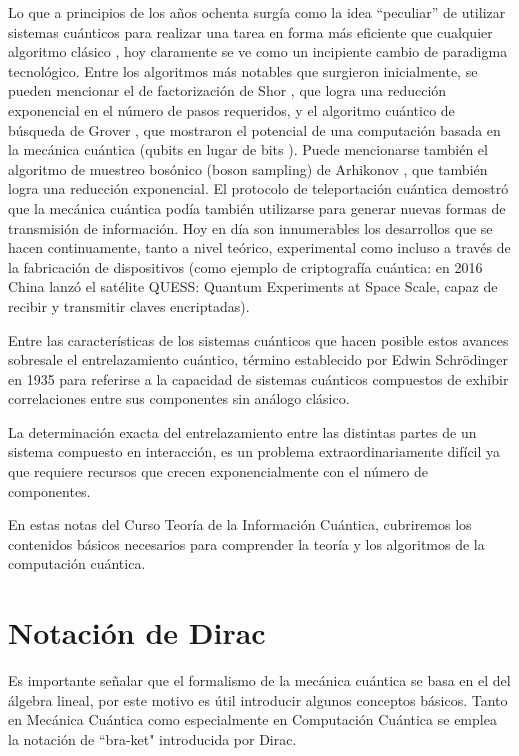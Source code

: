 Lo que a principios de los años ochenta 
surgía como la idea ``peculiar'' de utilizar sistemas cuánticos para realizar una tarea
en forma más eficiente que cualquier algoritmo clásico \cite{DEU.85}, 
hoy claramente se ve como un
incipiente cambio de paradigma tecnológico. 
Entre los algoritmos más notables que surgieron inicialmente, se pueden mencionar
el de factorización de Shor \cite{Sh.94}, que logra
una reducción exponencial en el número de pasos requeridos, y el algoritmo cuántico de búsqueda
de Grover \cite{GR.97}, que mostraron el potencial de una computación basada en la mecánica cuántica 
(qubits en lugar de bits \cite{NC.00}). Puede mencionarse también el algoritmo de muestreo bosónico (boson sampling) de Arhikonov \cite{AA.11}, que también logra una reducción exponencial. El protocolo de teleportación cuántica \cite{Be.93} demostró que la 
mecánica cuántica podía también utilizarse para generar nuevas formas de transmisión de información.
Hoy en día son innumerables los desarrollos  que se hacen continuamente, tanto a nivel teórico, experimental 
como incluso a través de la fabricación de dispositivos (como ejemplo de criptografía cuántica: en 2016 China lanzó el satélite QUESS: Quantum Experiments at Space Scale, capaz de recibir y transmitir claves encriptadas).

Entre las características de los sistemas cuánticos que hacen posible estos avances sobresale el entrelazamiento cuántico, término establecido por Edwin Schrödinger en 1935 \cite{Schr.35} 
para referirse a la capacidad de sistemas cuánticos compuestos de exhibir correlaciones entre sus componentes sin análogo clásico.

La determinación exacta del entrelazamiento entre las distintas partes de un sistema compuesto en interacción, es un problema extraordinariamente difícil ya que requiere recursos que crecen exponencialmente con el 
número de componentes.

En estas notas del Curso Teoría de la Información Cuántica, cubriremos los contenidos básicos necesarios para comprender la teoría y los algoritmos de la computación cuántica. 

\section{Notación de Dirac}
Es importante señalar que el formalismo de la mecánica cuántica se basa en el del álgebra lineal, por este motivo es útil introducir algunos conceptos básicos. Tanto en Mecánica Cuántica como especialmente en Computación Cuántica se emplea la notación de ``bra-ket" \; introducida por Dirac.

